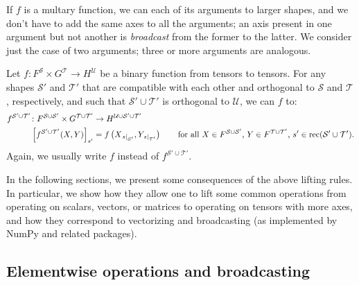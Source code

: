 If $f$ is a multary function, we can \liftVB{} each of its arguments to larger shapes, and we don't have to add the same axes to all the arguments; an axis present in one argument but not another is \emph{broadcast} from the former to the latter. We consider just the case of two arguments; three or more arguments are analogous. 
\begin{definition} \label{def:lifting2}
Let $f \colon F^{\mathcal{S}} \times G^{\mathcal{T}} \rightarrow H^{\mathcal{U}}$ be a binary function from tensors to tensors. For any shapes $\mathcal{S'}$ and $\mathcal{T'}$ that are compatible with each other and orthogonal to $\mathcal{S}$ and $\mathcal{T}$, respectively, and such that $\mathcal{S'} \cup \mathcal{T'}$ is orthogonal to $\mathcal{U}$, we can \liftVB{} $f$ to:
\begin{align*}
f^{\mathcal{S'} \cup \mathcal{T'}} \colon F^{\mathcal{S} \cup \mathcal{S'}} \times G^{\mathcal{T} \cup \mathcal{T'}} &\rightarrow H^{\mathcal{U} \cup \mathcal{S'} \cup \mathcal{T'}} \\
  \left[f^{\mathcal{S'} \cup \mathcal{T'}}(X,Y)\right]_{s'} &= f\left(X_{\mathopen{}\left.s\right|_{\mathcal{S'}}},Y_{\mathopen{}\left.s\right|_{\mathcal{T'}}}\right) \qquad \text{for all $X \in F^{\mathcal{S} \cup \mathcal{S'}}$, $Y \in F^{\mathcal{T} \cup \mathcal{T'}}$, $s' \in \operatorname{rec} (\mathcal{S'} \cup \mathcal{T'})$.}
\end{align*}
Again, we usually write $f$ instead of $f^{\mathcal{S'} \cup \mathcal{T'}}$.
\end{definition}

In the following sections, we present some consequences of the above lifting rules. In particular, we show how they allow one to lift some common operations from operating on scalars, vectors, or matrices to operating on tensors with more axes, and how they correspond to vectorizing and broadcasting (as implemented by NumPy and related packages).

\subsection{Elementwise operations and broadcasting}

